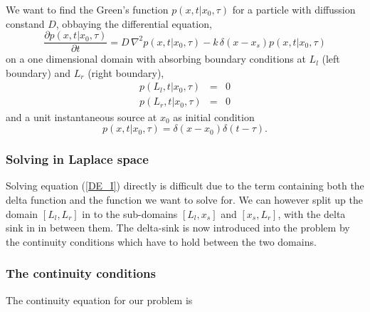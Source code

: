 We want to find the Green's function $p(x,t|x_0,\tau)$ for a particle with diffussion constand $D$, obbaying the differential equation,
\begin{equation}
 \frac{\partial p(x,t|x_0,\tau)}{\partial t} = D \, \nabla ^2 p(x,t|x_0,\tau) - k \, \delta (x - x_s) p(x,t|x_0,\tau)
 \label{DE_I}
\end{equation}
on a one dimensional domain with absorbing boundary conditions at $L_l$ (left boundary) and $L_r$ (right boundary),
\begin{eqnarray}
 p(L_l,t|x_0,\tau) & = & 0 \\
 p(L_r,t|x_0,\tau) & = & 0
\label{BC_I}
\end{eqnarray}
and a unit instantaneous source at $x_0$ as initial condition
\begin{equation}
 p(x,t|x_0,\tau) = \delta(x-x_0) \delta(t-\tau).
\label{IC_I}
\end{equation}

\subsubsection{Solving in Laplace space}

Solving equation (\ref{DE_I}) directly is difficult due to the term containing both the delta function and the function we want to solve for. We can however split up the domain $[L_l,L_r]$ in to the sub-domains $[L_l,x_s]$ and $[x_s,L_r]$, with the delta sink in in between them. The delta-sink is now introduced into the problem by the continuity conditions which have to hold between the two domains. 

\subsubsection{The continuity conditions}

The continuity equation for our problem is


